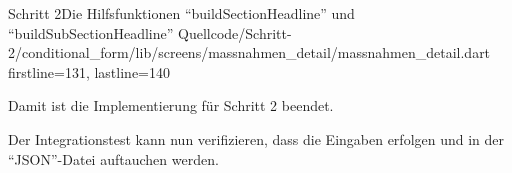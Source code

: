 \begin{alexlisting}{Schritt 2}{Die Hilfsfunktionen \enquote{buildSectionHeadline} und \enquote{buildSubSectionHeadline}}
  {Quellcode/Schritt-2/conditional_form/lib/screens/massnahmen_detail/massnahmen_detail.dart}
  {firstline=131, lastline=140}
  \label{lst:Schritt2buildSectionHeadlineBuildSubSectionHeadline}
\end{alexlisting}

Damit ist die Implementierung für Schritt 2 beendet.

Der Integrationstest kann nun verifizieren, dass die Eingaben erfolgen und in der \enquote{JSON}-Datei auftauchen werden.

